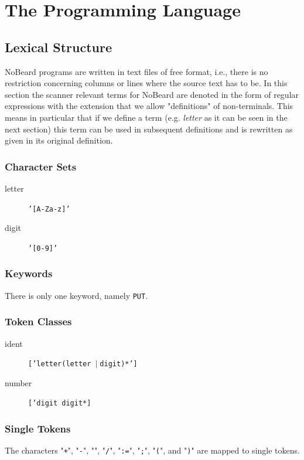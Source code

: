 \documentclass[11pt]{report}
\newcommand{\leongage}{NoBeard}
\newcommand{\alternative}{$\mid \;$}
\begin{document}
\chapter{The Programming Language}
\section{Lexical Structure}

\leongage{} programs are written in text files of free format, i.e., there is no restriction concerning columns or lines where
the source text has to be. In this section the scanner relevant terms for \leongage{} are denoted in the form of regular expressions
with the extension that we allow "definitions" of non-terminals. This means in particular that if we define a term (e.g.
{\em letter} as it can be seen in the next section) this term can be used in subsequent definitions and is rewritten as
given in its original definition.

\subsection{Character Sets}
\begin{description}
	\item[letter] \texttt{'[A-Za-z]'}
	\item[digit]\texttt{'[0-9]'}
\end{description}

\subsection{Keywords}
There is only one keyword, namely \texttt{PUT}.

\subsection{Token Classes}
\begin{description}
	\item[ident] \texttt{['letter(letter \alternative digit)*']}
	\item[number] \texttt{['digit digit*]}
\end{description}

\subsection{Single Tokens}
The characters "{\tt+}", "{\tt-}", "{\tt*}", "{\tt/}", "{\tt:=}", "{\tt;}", "{\tt(}", and "{\tt)}" are mapped to single tokens.
\end{document}
